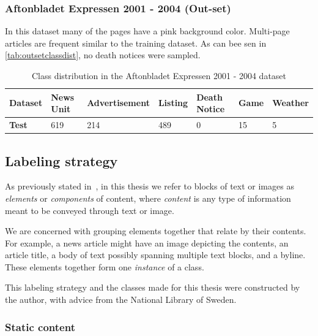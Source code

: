 \documentclass[oneside, english, bibtex]{kththesis}
\begin{document}
\subsubsection{Aftonbladet Expressen 2001 - 2004 (Out-set)}
\label{subsub:outset}

In this dataset many of the pages have a pink background color. Multi-page articles are frequent similar to the training dataset. As can bee sen in \autoref{tab:outsetclassdist}, no death notices were sampled. 

\begin{table}[H]
  \begin{center}
    \caption{Class distribution in the Aftonbladet Expressen 2001 - 2004 dataset}
    \label{tab:outsetclassdist}
    \begin{tabular}{l|l|l|l|l|l|l} %
    \textbf{Dataset} & \textbf{News Unit} & \textbf{Advertisement} & \textbf{Listing} & \textbf{Death Notice} & \textbf{Game} & \textbf{Weather}  \\
    \hline
    \textbf{Test} & 619 & 214 & 489 & 0 & 15 & 5 \\    \hline
    \end{tabular}
  \end{center}
\end{table}


\subsection{Labeling strategy}
\label{subsec:labelingstrat}

As previously stated in\ , in this thesis we refer to blocks of text or images as \textit{elements} or \textit{components} of content, where \textit{content} is any type of information meant to be conveyed through text or image.

We are concerned with grouping elements together that relate by their contents.
For example, a news article might have an image depicting the contents, an article title, a body of text possibly spanning multiple text blocks, and a byline.
These elements together form one \textit{instance} of a class.

This labeling strategy and the classes made for this thesis were constructed by the author, with advice from the National Library of Sweden.

\subsubsection{Static content}
\label{subsec:static}
\end{document}
